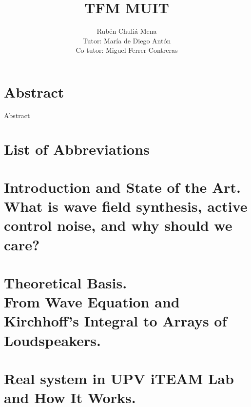 \documentclass[10pt]{report}
\providecommand\phantomsection{}
\begin{document}
\author{
	Rub\'{e}n Chuli\'{a} Mena \\
	Tutor: Mar\'ia de Diego Ant\'on \\
	Co-tutor: Miguel Ferrer Contreras
}
\title{TFM MUIT}
\date{}
\maketitle
{}

\phantomsection %
\tableofcontents

\newpage

\phantomsection
{}
\chapter*{Abstract}
Abstract

\newpage

\phantomsection
\listoffigures

\newpage

\phantomsection
{}
\chapter*{List of Abbreviations}


\newpage
\setcounter{page}{1}
\chapter[Introduction and State of the Art]{Introduction and State of the Art.\\What is wave field synthesis, active control noise, and why should we care?}


\chapter[Theoretical Basis]{Theoretical Basis.\\From Wave Equation and Kirchhoff's Integral to Arrays of Loudspeakers.}



\chapter{Real system in UPV iTEAM Lab and How It Works.}

%
\end{document}
